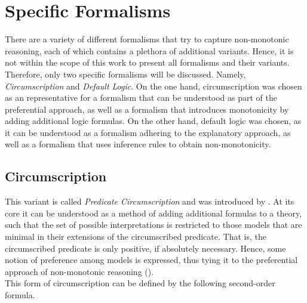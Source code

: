 \documentclass{extarticle}
\begin{document}
\section{Specific Formalisms}
There are a variety of different formalisms that try to capture non-monotonic reasoning, each of which contains a plethora of additional variants. Hence, it is not within the scope of this work to present all formalisms and their variants. Therefore, only two specific formalisms will be discussed. Namely, \emph{Circumscription} and \emph{Default Logic}. On the one hand, circumscription was chosen as an representative for a formalism that can be understood as part of the preferential approach, as well as a formalism that introduces monotonicity by adding additional logic formulas. On the other hand, default logic was chosen, as it can be understood as a formalism adhering to the explanatory approach, as well as a formalism that uses inference rules to obtain non-monotonicity.
 

\subsection{Circumscription}
This variant is called \emph{Predicate Circumscription} and was introduced by \cite{mccarthy1981circumscription}. At its core it can be understood as a method of adding additional formulas to a theory, such that the set of possible interpretations is restricted to those models that are minimal in their extensions of the circumscribed predicate. That is, the circumscribed predicate is only positive, if absolutely necessary. Hence, some notion of preference among models is expressed, thus tying it to the preferential approach of non-monotonic reasoning (\cite{BOCHMAN2007557, brewka1997nonmonotonic}). \\
This form of circumscription can be defined by the following second-order formula.
\end{document}
